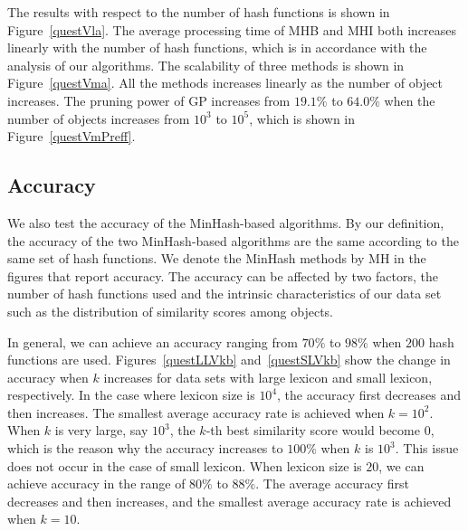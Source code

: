 The results with respect to the number of hash functions is shown in Figure~\ref{questVla}.  The average processing time of MHB and MHI both increases linearly with the number of hash functions, which is in accordance with the analysis of our algorithms.  The scalability of three methods is shown in Figure~\ref{questVma}.  All the methods increases linearly as the number of object increases.  The pruning power of GP increases from $19.1\%$ to $64.0\%$ when the number of objects increases from $10^3$ to $10^5$, which is shown in Figure~\ref{questVmPreff}.   

\subsection{Accuracy}
We also test the accuracy of the MinHash-based algorithms. By our definition, the accuracy of the two MinHash-based algorithms are the same according to the same set of hash functions. We denote the MinHash methods by MH in the figures that report accuracy. The accuracy can be affected by two factors, the number of hash functions used and the intrinsic characteristics of our data set such as the distribution of similarity scores among objects. 

In general, we can achieve an accuracy ranging from $70\%$ to $98\%$ when $200$ hash functions are used. Figures~\ref{questLLVkb} and~\ref{questSLVkb} show the change in accuracy when $k$ increases for data sets with large lexicon and small lexicon, respectively. In the case where lexicon size is $10^4$, the accuracy first decreases and then increases. The smallest average accuracy rate is achieved when $k = 10^2$. When $k$ is very large, say $10^3$, the $k$-th best similarity score would become $0$, which is the reason why the accuracy increases to $100\%$ when $k$ is $10^3$. This issue does not occur in the case of small lexicon. When lexicon size is $20$, we can achieve accuracy in the range of $80\%$ to $88\%$. The average accuracy first decreases and then increases, and the smallest average accuracy rate is achieved when $k = 10$.   


